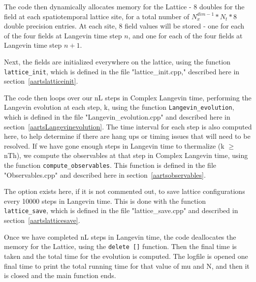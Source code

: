 \documentclass[../../RotatingBosons.tex]{subfiles}
\begin{document}
The code then dynamically allocates memory for the Lattice - 8 doubles for the field at each spatiotemporal lattice site, for a total number of $N_{x}^{dim-1}*N_{t}*8$ double precision entries. At each site, 8 field values will be stored - one for each of the four fields at Langevin time step $n$, and one for each of the four fields at Langevin time step $n+1$.

Next, the fields are initialized everywhere on the lattice, using the function \lstinline{lattice_init}, which is defined in the file "lattice\_init.cpp," described here in section~\ref{aartslatticeinit}.

The code then loops over our nL steps in Complex Langevin time, performing the Langevin evolution at each step, k, using the function \lstinline{Langevin_evolution}, which is defined in the file "Langevin\_evolution.cpp" and described here in section~\ref{aartsLangevinevolution}. The time interval for each step is also computed here, to help determine if there are hang ups or timing issues that will need to be resolved.  If we have gone enough steps in Langevin time to thermalize (k $\geq$ nTh), we compute the observables at that step in Complex Langevin time, using the function \lstinline{compute_observables}. This function is defined in the file "Observables.cpp" and described here in section~\ref{aartsobservables}.

The option exists here, if it is not commented out, to save lattice configurations every 10000 steps in Langevin time. This is done with the function \lstinline{lattice_save}, which is defined in the file "lattice\_save.cpp" and described in section~\ref{aartslatticesave}.

Once we have completed nL steps in Langevin time, the code deallocates the memory for the Lattice, using the \lstinline{delete []} function. Then the final time is taken and the total time for the evolution is computed. The logfile is opened one final time to print the total running time for that value of mu and N, and then it is closed and the main function ends.
\end{document}
